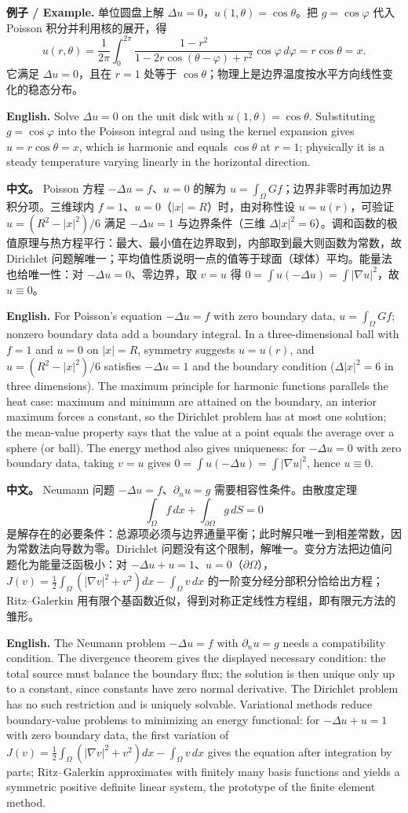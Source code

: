 \documentclass[UTF8,11pt,a4paper]{ctexart}
\newcommand{\EN}[1]{\par\noindent \textbf{English.} #1\par}
\newcommand{\EX}[2]{\par\noindent \textbf{例子 / Example.} #1\par\EN{#2}}
\newcommand{\APS}[2]{\par\noindent\textbf{中文。} #1\par\noindent\textbf{English.} #2\par\smallskip}
\begin{document}
\EX{单位圆盘上解 $\Delta u=0$，$u(1,\theta)=\cos\theta$。把 $g=\cos\varphi$ 代入 Poisson 积分并利用核的展开，得
\[
u(r,\theta)=\frac1{2\pi}\int_0^{2\pi}\frac{1-r^2}{1-2r\cos(\theta-\varphi)+r^2}\cos\varphi\,d\varphi=r\cos\theta=x .
\]
它满足 $\Delta u=0$，且在 $r=1$ 处等于 $\cos\theta$；物理上是边界温度按水平方向线性变化的稳态分布。}{Solve $\Delta u=0$ on the unit disk with $u(1,\theta)=\cos\theta$. Substituting $g=\cos\varphi$ into the Poisson integral and using the kernel expansion gives $u=r\cos\theta=x$, which is harmonic and equals $\cos\theta$ at $r=1$; physically it is a steady temperature varying linearly in the horizontal direction.}
\APS{Poisson 方程 $-\Delta u=f$、$u=0$ 的解为 $u=\int_\Omega Gf$；边界非零时再加边界积分项。三维球内 $f=1$、$u=0$（$|x|=R$）时，由对称性设 $u=u(r)$，可验证 $u=(R^2-|x|^2)/6$ 满足 $-\Delta u=1$ 与边界条件（三维 $\Delta|x|^2=6$）。调和函数的极值原理与热方程平行：最大、最小值在边界取到，内部取到最大则函数为常数，故 Dirichlet 问题解唯一；平均值性质说明一点的值等于球面（球体）平均。能量法也给唯一性：对 $-\Delta u=0$、零边界，取 $v=u$ 得 $0=\int u(-\Delta u)=\int|\nabla u|^2$，故 $u\equiv0$。}{For Poisson's equation $-\Delta u=f$ with zero boundary data, $u=\int_\Omega Gf$; nonzero boundary data add a boundary integral. In a three-dimensional ball with $f=1$ and $u=0$ on $|x|=R$, symmetry suggests $u=u(r)$, and $u=(R^2-|x|^2)/6$ satisfies $-\Delta u=1$ and the boundary condition ($\Delta|x|^2=6$ in three dimensions). The maximum principle for harmonic functions parallels the heat case: maximum and minimum are attained on the boundary, an interior maximum forces a constant, so the Dirichlet problem has at most one solution; the mean-value property says that the value at a point equals the average over a sphere (or ball). The energy method also gives uniqueness: for $-\Delta u=0$ with zero boundary data, taking $v=u$ gives $0=\int u(-\Delta u)=\int|\nabla u|^2$, hence $u\equiv0$.}
\APS{Neumann 问题 $-\Delta u=f$、$\partial_nu=g$ 需要相容性条件。由散度定理
\[
\int_\Omega f\,dx+\int_{\partial\Omega}g\,dS=0
\]
是解存在的必要条件：总源项必须与边界通量平衡；此时解只唯一到相差常数，因为常数法向导数为零。Dirichlet 问题没有这个限制，解唯一。变分方法把边值问题化为能量泛函极小：对 $-\Delta u+u=1$、$u=0$（$\partial\Omega$），$J(v)=\frac12\int_\Omega(|\nabla v|^2+v^2)dx-\int_\Omega v\,dx$ 的一阶变分经分部积分恰给出方程；Ritz--Galerkin 用有限个基函数近似，得到对称正定线性方程组，即有限元方法的雏形。}{The Neumann problem $-\Delta u=f$ with $\partial_nu=g$ needs a compatibility condition. The divergence theorem gives the displayed necessary condition: the total source must balance the boundary flux; the solution is then unique only up to a constant, since constants have zero normal derivative. The Dirichlet problem has no such restriction and is uniquely solvable. Variational methods reduce boundary-value problems to minimizing an energy functional: for $-\Delta u+u=1$ with zero boundary data, the first variation of $J(v)=\frac12\int_\Omega(|\nabla v|^2+v^2)dx-\int_\Omega v\,dx$ gives the equation after integration by parts; Ritz--Galerkin approximates with finitely many basis functions and yields a symmetric positive definite linear system, the prototype of the finite element method.}
\end{document}
